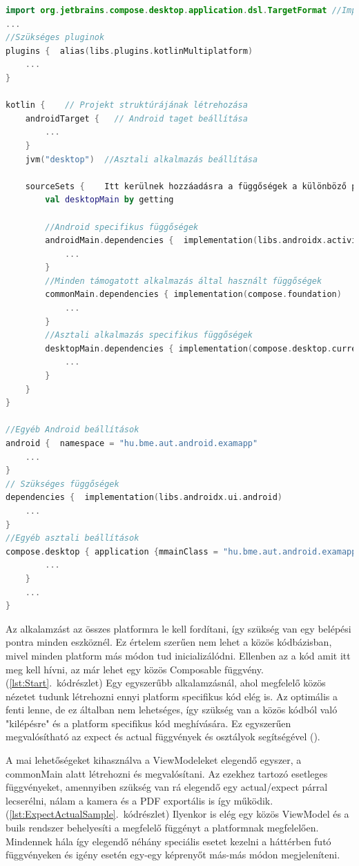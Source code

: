 \begin{lstlisting}[caption={build.gradle.kts fájl struktúrája}, label={lst:Gradle}, language=Kotlin]
import org.jetbrains.compose.desktop.application.dsl.TargetFormat //Importok
...
//Szükséges pluginok
plugins {  alias(libs.plugins.kotlinMultiplatform)
    ...
}

kotlin {    // Projekt struktúrájának létrehozása
    androidTarget {   // Android taget beállítása
        ...
    }
    jvm("desktop")  //Asztali alkalmazás beállítása
    
    sourceSets {    Itt kerülnek hozzáadásra a függőségek a különböző platformokhoz
        val desktopMain by getting

        //Android specifikus függőségek
        androidMain.dependencies {  implementation(libs.androidx.activity.compose)
            ...
        }
        //Minden támogatott alkalmazás által használt függőségek
        commonMain.dependencies { implementation(compose.foundation)
            ...
        }
        //Asztali alkalmazás specifikus függőségek
        desktopMain.dependencies { implementation(compose.desktop.currentOs)
            ...
        }
    }
}

//Egyéb Android beállítások
android {  namespace = "hu.bme.aut.android.examapp" 
    ... 
}
// Szükséges függőségek
dependencies {  implementation(libs.androidx.ui.android)
    ...
}
//Egyéb asztali beállítások 
compose.desktop { application {mmainClass = "hu.bme.aut.android.examapp.MainKt"
        ...
    }
    ...
}
\end{lstlisting}

Az alkalamzást az összes platformra le kell fordítani, így szükség van egy belépési pontra minden eszköznél.
Ez értelem szerűen nem lehet a közös kódbázisban, mivel minden platform más módon tud inicializálódni.
Ellenben az a kód amit itt meg kell hívni, az már lehet egy közös Composable függvény. (\ref{lst:Start}.~kódrészlet)
Egy egyszerűbb alkalamzásnál, ahol megfelelő közös nézetet tudunk létrehozni ennyi platform specifikus kód elég is.
Az optimális a fenti lenne, de ez általban nem lehetséges, így szükség van a közös kódból való "kilépésre" és a platform specifikus kód meghívására.
Ez egyszerűen megvalósítható az expect és actual függvények és osztályok segítségével ().

A mai lehetőségeket kihasználva a ViewModeleket elegendő egyszer, a commonMain alatt létrehozni és megvalósítani.
Az ezekhez tartozó esetleges függvényeket, amennyiben szükség van rá elegendő egy actual/expect párral lecserélni, nálam a kamera és a PDF exportális is így működik. (\ref{lst:ExpectActualSample}.~kódrészlet)
Ilyenkor is elég egy közös ViewModel és a buils rendszer behelyesíti a megfelelő függényt a platformnak megfelelően.
Mindennek hála így elegendő néhány speciális esetet kezelni a háttérben futó függvényeken és igény esetén egy-egy képrenyőt más-más módon megjeleníteni.


